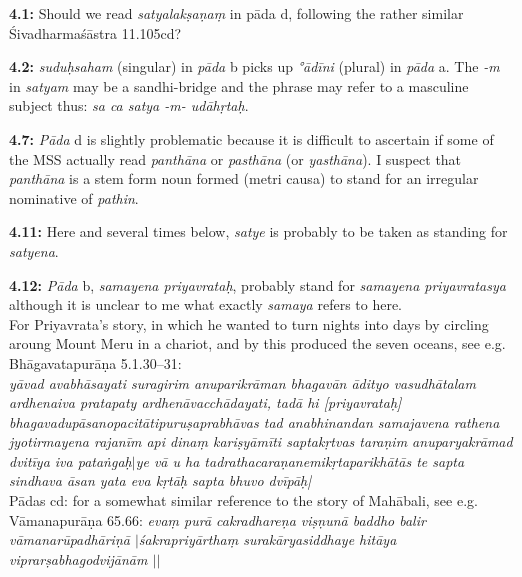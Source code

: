 \documentclass{article}
\newcommand{\vsnum}[1]{\textbf{#1}}
\newcommand{\skt}[1]{\textit{#1}}
\begin{document}
\vsnum{4.1: }Should we read \skt{satyalakṣaṇaṃ} in pāda d, following the rather similar Śivadharmaśāstra 11.105cd?

\vsnum{4.2: }\skt{suduḥsaham} (singular) in \skt{pāda} b picks up \skt{°ādīni} (plural) in \skt{pāda} a. The \skt{-m} in \skt{satyam} may be a sandhi-bridge and the phrase may refer to a masculine subject thus: \skt{sa ca satya -m- udāhṛtaḥ}.

\vsnum{4.7: }\skt{Pāda} d is slightly problematic because it is difficult to ascertain if some of the MSS actually read \skt{panthāna} or \skt{pasthāna} (or \skt{yasthāna}). I suspect that \skt{panthāna} is a stem form noun formed (metri causa) to stand for an irregular nominative of \skt{pathin}.

\vsnum{4.11: }Here and several times below, \skt{satye} is probably to be taken as standing for \skt{satyena}.

\vsnum{4.12: }\skt{Pāda} b, \skt{samayena priyavrataḥ}, probably stand for \skt{samayena priyavratasya} although it is unclear to me what exactly \skt{samaya} refers to here. \\ For Priyavrata's story, in which he wanted to turn nights into days by circling aroung Mount Meru in a chariot, and by this produced the seven oceans, see e.g. Bhāgavatapurāṇa 5.1.30--31:\\ \skt{yāvad avabhāsayati suragirim anuparikrāman bhagavān ādityo vasudhātalam ardhenaiva pratapaty ardhenāvacchādayati, tadā hi [priyavrataḥ] bhagavadupāsanopacitātipuruṣaprabhāvas tad anabhinandan samajavena rathena jyotirmayena rajanīm api dinaṃ kariṣyāmīti saptakṛtvas taraṇim anuparyakrāmad dvitīya iva pataṅgaḥ$|$ye vā u ha tadrathacaraṇanemikṛtaparikhātās te sapta sindhava āsan yata eva kṛtāḥ sapta bhuvo dvīpāḥ|}  \\Pādas cd: for a somewhat similar reference to the story of Mahābali, see e.g. Vāmanapurāṇa 65.66: \skt{evaṃ purā cakradhareṇa viṣṇunā baddho balir vāmanarūpadhāriṇā $|$śakrapriyārthaṃ surakāryasiddhaye hitāya viprarṣabhagodvijānām $||$} 
\end{document}
